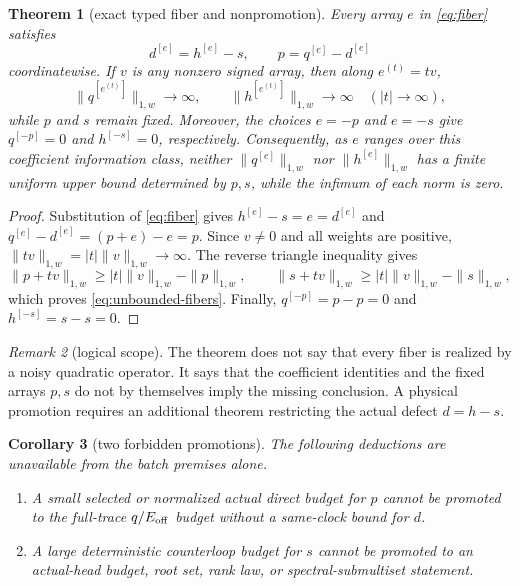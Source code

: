 \documentclass[11pt]{article}
\newtheorem{theorem}{Theorem}[section]
\newtheorem{corollary}[theorem]{Corollary}
\theoremstyle{definition}
\theoremstyle{remark}
\newtheorem{remark}[theorem]{Remark}
\begin{document}
\begin{theorem}[exact typed fiber and nonpromotion]\label{thm:fiber}
Every array $e$ in \eqref{eq:fiber} satisfies
\begin{equation}\label{eq:fiber-exact}
 d^{[e]}=h^{[e]}-s,\qquad
 p=q^{[e]}-d^{[e]}
\end{equation}
coordinatewise.  If $v$ is any nonzero signed array, then along
$e^{(t)}=tv$,
\begin{equation}\label{eq:unbounded-fibers}
 \|q^{[e^{(t)}]}\|_{1,w}\longrightarrow\infty,\qquad
 \|h^{[e^{(t)}]}\|_{1,w}\longrightarrow\infty
 \quad (|t|\to\infty),
\end{equation}
while $p$ and $s$ remain fixed.  Moreover, the choices $e=-p$ and $e=-s$
give $q^{[-p]}=0$ and $h^{[-s]}=0$, respectively.  Consequently, as $e$
ranges over this coefficient information class, neither
$\|q^{[e]}\|_{1,w}$ nor $\|h^{[e]}\|_{1,w}$ has a finite uniform upper
bound determined by $p,s$, while the infimum of each norm is zero.
\end{theorem}

\begin{proof}
Substitution of \eqref{eq:fiber} gives
$h^{[e]}-s=e=d^{[e]}$ and
$q^{[e]}-d^{[e]}=(p+e)-e=p$.  Since $v\ne0$ and all weights are positive,
$\|tv\|_{1,w}=|t|\|v\|_{1,w}\to\infty$.  The reverse triangle inequality
gives
\[
 \|p+tv\|_{1,w}\ge |t|\|v\|_{1,w}-\|p\|_{1,w},
 \qquad
 \|s+tv\|_{1,w}\ge |t|\|v\|_{1,w}-\|s\|_{1,w},
\]
which proves \eqref{eq:unbounded-fibers}.  Finally,
$q^{[-p]}=p-p=0$ and $h^{[-s]}=s-s=0$.
\end{proof}

\begin{remark}[logical scope]
The theorem does not say that every fiber is realized by a noisy quadratic
operator.  It says that the coefficient identities and the fixed arrays
$p,s$ do not by themselves imply the missing conclusion.  A physical
promotion requires an additional theorem restricting the actual defect
$d=h-s$.
\end{remark}

\begin{corollary}[two forbidden promotions]\label{cor:forbidden}
The following deductions are unavailable from the batch premises alone.
\begin{enumerate}
\item A small selected or normalized actual direct budget for $p$ cannot be
promoted to the full-trace $q/E_{\rm off}$ budget without a same-clock bound
for $d$.
\item A large deterministic counterloop budget for $s$ cannot be promoted to
an actual-head budget, root set, rank law, or spectral-submultiset statement.
\end{enumerate}
\end{corollary}
\end{document}
